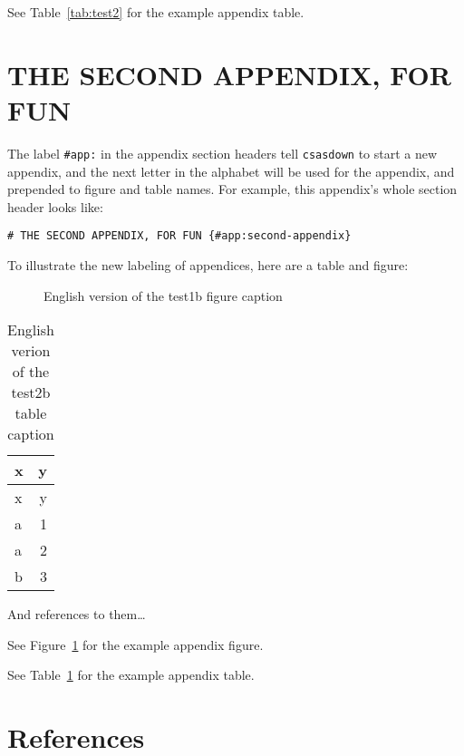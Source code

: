 \documentclass[12pt]{article}\usepackage[]{graphicx}\usepackage[]{color}
\begin{document}
\begin{appendices}
See Table~\ref{tab:test2} for the example appendix table.

\clearpage

\section{THE SECOND APPENDIX, FOR FUN}\label{app:second-appendix}

The label \texttt{\#app:} in the appendix section headers tell \texttt{csasdown} to start a new appendix, and the next letter in the alphabet will be used for the appendix, and prepended to figure and table names. For example, this appendix's whole section header looks like:

\texttt{\#\ THE\ SECOND\ APPENDIX,\ FOR\ FUN\ \{\#app:second-appendix\}}

To illustrate the new labeling of appendices, here are a table and figure:




\begin{figure}[htb]

{\centering {} 

}

\caption{English version of the test1b figure caption}\label{fig:test1b}
\end{figure}
\begin{longtable}[]{@{}lr@{}}
\caption{\label{tab:test2b}English verion of the test2b table caption}\tabularnewline
\toprule
x & y\tabularnewline
\midrule
\endfirsthead
\toprule
x & y\tabularnewline
\midrule
\endhead
a & 1\tabularnewline
a & 2\tabularnewline
b & 3\tabularnewline
\bottomrule
\end{longtable}
And references to them\ldots{}

See Figure~\ref{fig:test1b} for the example appendix figure.

See Table~\ref{tab:test2b} for the example appendix table.

\end{appendices}

\clearpage

\section{References}\label{references}

\noindent
\vspace{-2em} \setlength{\parindent}{-0.2in} \setlength{\leftskip}{0.2in} \setlength{\parskip}{8pt}
\end{document}
